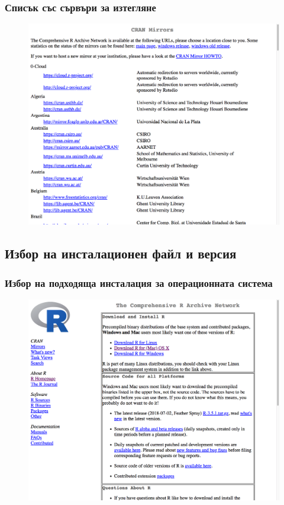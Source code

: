 \documentclass{beamer}
\begin{document}
\begin{frame}
\frametitle{Списък със сървъри за изтегляне}
\begin{figure}[]\includegraphics[width=\textwidth,height=0.75\textheight]{pic0002}\end{figure}
\end{frame}

\subsection{Избор на инсталационен файл и версия}

\begin{frame}
\frametitle{Избор на подходяща инсталация за операционната система}
\begin{figure}[]\includegraphics[width=\textwidth,height=0.75\textheight]{pic0003}\end{figure}
\end{frame}
\end{document}
